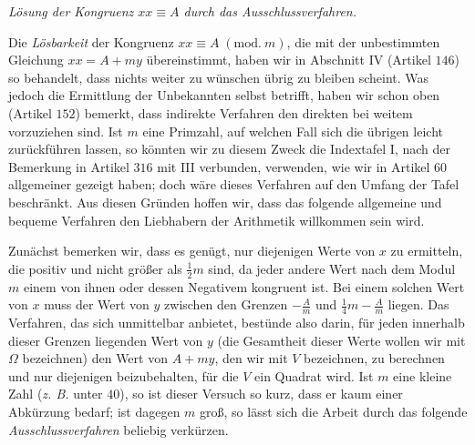 \begin{center}\textit{Lösung der Kongruenz \(xx\equiv A\) durch das Ausschlussverfahren.}\end{center}


Die \textit{Lösbarkeit} der Kongruenz \(xx\equiv A\; (\mathrm{mod}.\ m)\), die mit der unbestimmten Gleichung \(xx=A+my\) übereinstimmt, haben wir in Abschnitt IV (Artikel \(146\)) so behandelt, dass nichts weiter zu wünschen übrig zu bleiben scheint. Was jedoch die Ermittlung der Unbekannten selbst betrifft, haben wir schon oben (Artikel \(152\)) bemerkt, dass indirekte Verfahren den direkten bei weitem vorzuziehen sind. Ist \(m\) eine Primzahl, auf welchen Fall sich die übrigen leicht zurückführen lassen, so könnten wir zu diesem Zweck die Indextafel I, nach der Bemerkung in Artikel \(316\) mit III verbunden, verwenden, wie wir in Artikel \(60\) allgemeiner gezeigt haben; doch wäre dieses Verfahren auf den Umfang der Tafel beschränkt. Aus diesen Gründen hoffen wir, dass das folgende allgemeine und bequeme Verfahren den Liebhabern der Arithmetik willkommen sein wird.

Zunächst bemerken wir, dass es genügt, nur diejenigen Werte von \(x\) zu ermitteln, die positiv und nicht größer als \(\frac12m\) sind, da jeder andere Wert nach dem Modul \(m\) einem von ihnen oder dessen Negativem kongruent ist. Bei einem solchen Wert von \(x\) muss der Wert von \(y\) zwischen den Grenzen \(-\frac Am\) und \(\frac14m-\frac Am\) liegen. Das Verfahren, das sich unmittelbar anbietet, bestünde also darin, für jeden innerhalb dieser Grenzen liegenden Wert von \(y\) (die Gesamtheit dieser Werte wollen wir mit \(\Omega\) bezeichnen) den Wert von \(A+my\), den wir mit \(V\) bezeichnen, zu berechnen und nur diejenigen beizubehalten, für die \(V\) ein Quadrat wird. Ist \(m\) eine kleine Zahl (\textit{z. B.} unter \(40\)), so ist dieser Versuch so kurz, dass er kaum einer Abkürzung bedarf; ist dagegen \(m\) groß, so lässt sich die Arbeit durch das folgende \textit{Ausschlussverfahren} beliebig verkürzen.

